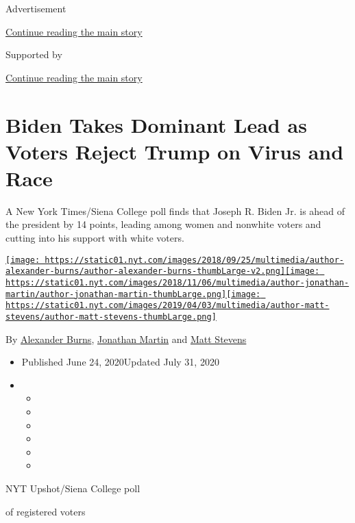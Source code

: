 Advertisement

\protect\hyperlink{after-top}{Continue reading the main story}

Supported by

\protect\hyperlink{after-sponsor}{Continue reading the main story}

\hypertarget{biden-takes-dominant-lead-as-voters-reject-trump-on-virus-and-race}{%
\section{Biden Takes Dominant Lead as Voters Reject Trump on Virus and
Race}\label{biden-takes-dominant-lead-as-voters-reject-trump-on-virus-and-race}}

A New York Times/Siena College poll finds that Joseph R. Biden Jr. is
ahead of the president by 14 points, leading among women and nonwhite
voters and cutting into his support with white voters.

\href{https://www.nytimes.com/by/alexander-burns}{\texttt{[image: https://static01.nyt.com/images/2018/09/25/multimedia/author-alexander-burns/author-alexander-burns-thumbLarge-v2.png]}}\href{https://www.nytimes.com/by/jonathan-martin}{\texttt{[image: https://static01.nyt.com/images/2018/11/06/multimedia/author-jonathan-martin/author-jonathan-martin-thumbLarge.png]}}\href{https://www.nytimes.com/by/matt-stevens}{\texttt{[image: https://static01.nyt.com/images/2019/04/03/multimedia/author-matt-stevens/author-matt-stevens-thumbLarge.png]}}

By \href{https://www.nytimes.com/by/alexander-burns}{Alexander Burns},
\href{https://www.nytimes.com/by/jonathan-martin}{Jonathan Martin} and
\href{https://www.nytimes.com/by/matt-stevens}{Matt Stevens}

\begin{itemize}
\item
  Published June 24, 2020Updated July 31, 2020
\item
  \begin{itemize}
  \item
  \item
  \item
  \item
  \item
  \item
  \end{itemize}
\end{itemize}

NYT Upshot/Siena College poll

of registered voters

